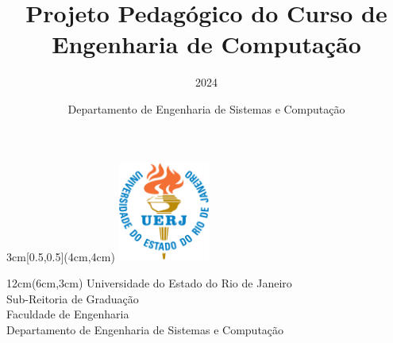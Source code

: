 \documentclass[envcountsame,envcountchap,openany]{svmono}
\begin{document}
\author {Departamento de Engenharia de Sistemas e Computação}

\begin{textblock*}{3cm}[0.5,0.5](4cm,4cm)
	\includegraphics[width=3cm]{imagens/logo_uerj_cor.jpg}
\end{textblock*}
\begin{textblock*}{12cm}(6cm,3cm)   %
	Universidade do Estado do Rio de Janeiro\\
	Sub-Reitoria de Graduação \\
	Faculdade de Engenharia\\
	Departamento de Engenharia de Sistemas e Computação
\end{textblock*}

\title{Projeto Pedagógico do Curso de Engenharia de Computação}
\subtitle{2024}
\date{} 
\maketitle
\pagestyle{empty}
\vfill

\tableofcontents
\listoftables

\frontmatter%

\mainmatter%
\pagestyle{fancy}




\backmatter%

\appendix
\appendixpage

\addappheadtotoc
\end{document}
